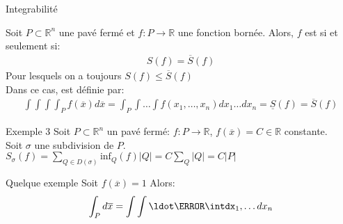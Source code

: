 \begin{parag}{Integrabilité}
    \begin{definition}
        Soit $P \subset \mathbb{R}^{n}$ une pavé fermé et $f: P \to \mathbb{R}$ une fonction bornée. Alors,  $f$ est  si et seulement si:
        \begin{align*} S\left(f\right) =  \overline{S}\left(f\right)  \end{align*}
        Pour lesquels on a toujours $S\left(f\right) \leq \overline{S} \left(f\right)$\\
        Dans ce cas,  est définie par:
        \begin{align*} \int \int \int \int_P f\left(\overline{x}\right) d\overline{x} =  \int_P \int\ldots\int f\left(x_1, \ldots, x_n\right) dx_1 \ldots dx_n =  \underline{S}\left(f\right) =  \overline{S}\left(f\right) \end{align*}
    \end{definition}
\end{parag}
\begin{parag}{Exemple $3$}
    Soit $P \subset \mathbb{R}^{n}$ un pavé fermé: $f: P \to \mathbb{R}$, $f\left(\overline{x}\right) =  C \in \mathbb{R}$ constante.\\
    Soit $\sigma$ une subdivision de $P$. $S_{\sigma}\left(f\right) =  \sum_{Q \in D\left(\sigma\right)} \text{inf}_Q\left(f\right)\left|Q\right| =  C \sum_{Q}\left|Q\right|= C \left|P\right| $
\end{parag}

\begin{parag}{Quelque exemple}
    Soit $f\left(\overline{x}\right) =  1$ Alors:
    \begin{align*} \int_P d\overline{x} =  \int\int\ldot\s\intdx_1, \ldots dx_n \end{align*}
\end{parag}

